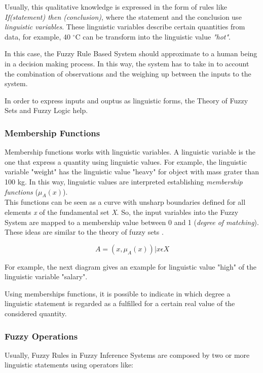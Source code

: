 Usually, this qualitative knowledge is expressed in the form of rules like \textit{If(statement) then (conclusion)}, where the statement and the conclusion use \textit{linguistic variables}. These linguistic variables describe certain quantities from data, for example, 40 $^{\circ}$C can be transform into the linguistic value \textit{"hot"}.

In this case, the Fuzzy Rule Based System should approximate to a human being in a decision making process. In this way, the system has to take in to account the combination of observations and the weighing up between the inputs to the system. 

In order to express inputs and ouptus as linguistic forms, the Theory of Fuzzy Sets and Fuzzy Logic help. 

\subsubsection{Membership Functions}
 Membership functions works with linguistic variables. A linguistic variable is the one that express a quantity using linguistic values. For example, the linguistic variable "weight" has the linguistic value "heavy" for object with mass grater than 100 kg. 
 In this way, linguistic values are interpreted establishing \textit{membership functions} ($\mu_A(x)$). \\
 
 This functions can be seen as a curve with unsharp boundaries defined for all elements \textit{x} of the fundamental set \textit{X}. So, the input variables into the Fuzzy System are mapped to a membership value between 0 and 1 (\textit{degree of matching}). These ideas are similar to the theory of fuzzy sets \cite{zade1968}.

 \begin{center}
\begin{equation}
\label{fuzzySet}
	A = {(x, \mu_A(x)) | x \epsilon X }
\end{equation}
\end{center}

For example, the next diagram \cite{DIAGRAMA1} gives an example for linguistic value "high" of the linguistic variable "salary".

Using memberships functions, it is possible to indicate in which degree a linguistic statement is regarded as a fulfilled for a certain real value of the considered quantity.

\subsubsection{Fuzzy Operations}
Usually, Fuzzy Rules in Fuzzy Inference Systems are composed by two or more linguistic statements using operators like: \\


